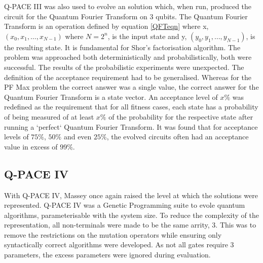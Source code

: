 Q-PACE III was also used to evolve an solution which, when run, produced the circuit for the Quantum Fourier Transform on 3 qubits.
The Quantum Fourier Transform is an operation defined by equation \ref{QFTeqn} where x, $(x_0, x_1, \ldots, x_{N-1})$ where $N = 2^n$, is the input state and y, $(y_0, y_1, \ldots, y_{N-1})$, is the resulting state.
It is fundamental for Shor's factorisation algorithm.
The problem was approached both deterministically and probabilistically, both were successful.
The results of the probabilistic experiments were unexpected.
The definition of the acceptance requirement had to be generalised.
Whereas for the PF Max problem the correct answer was a single value, the correct answer for the Quantum Fourier Transform is a state vector.
An acceptance level of $x\%$ was redefined as the requirement that for all fitness cases, each state has a probability of being measured of at least $x\%$ of the probability for the respective state after running a `perfect` Quantum Fourier Transform.
It was found that for acceptance levels of $75\%$, $50\%$ and even $25\%$, the evolved circuits often had an acceptance value in excess of $99\%$.

\subsection{Q-PACE IV}
With Q-PACE IV, Massey once again raised the level at which the solutions were represented.
Q-PACE IV was a Genetic Programming suite to evole quantum algorithms, parameterisable with the system size.
To reduce the complexity of the representation, all non-terminals were made to be the same arrity, 3.
This was to remove the restrictions on the mutation operators while ensuring only syntactically correct algorithms were developed.
As not all gates require 3 parameters, the excess parameters were ignored during evaluation.

